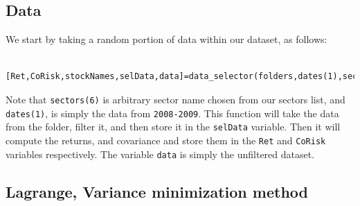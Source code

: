 \documentclass[12pt,titlepage,a4paper]{article}
\begin{document}
\subsection*{Data}

\begin{par}
We start by taking a random portion of data within our dataset, as follows:
\end{par}
\begin{verbatim}
	[Ret,CoRisk,stockNames,selData,data]=data_selector(folders,dates(1),sectors(6));
\end{verbatim}
\begin{par}
Note that \texttt{sectors(6)} is arbitrary sector name chosen from our sectors list, and \texttt{dates(1)}, is simply the data from \texttt{2008-2009}. This function will take the data from the folder, filter it, and then store it in the \texttt{selData} variable. Then it will compute the returns, and covariance and store them in the \texttt{Ret} and \texttt{CoRisk} variables respectively. The variable \texttt{data} is simply the unfiltered dataset.
\end{par} \vspace{1em}


\subsection*{Lagrange, Variance minimization method}
\end{document}
